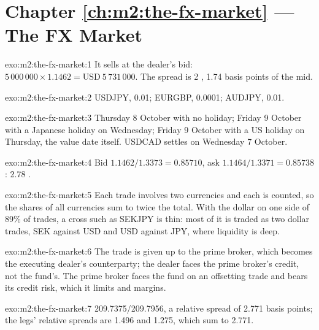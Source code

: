 \section*{Chapter \ref{ch:m2:the-fx-market} --- The FX Market}

\begin{solution}{exo:m2:the-fx-market:1}
It sells at the dealer's bid: $5\,000\,000 \times 1.1462 = \text{USD}~5\,731\,000$.
The spread is 2 , 1.74 basis points of the mid.
\end{solution}

\begin{solution}{exo:m2:the-fx-market:2}
USDJPY,  0.01; EURGBP,  0.0001; AUDJPY,  0.01.
\end{solution}

\begin{solution}{exo:m2:the-fx-market:3}
Thursday 8 October with no holiday; Friday 9 October with a Japanese holiday on
Wednesday; Friday 9 October with a US holiday on Thursday, the value date itself.
USDCAD settles on Wednesday 7 October.
\end{solution}

\begin{solution}{exo:m2:the-fx-market:4}
Bid $1.1462/1.3373 = 0.85710$, ask $1.1464/1.3371 = 0.85738$: 2.78 .
\end{solution}

\begin{solution}{exo:m2:the-fx-market:5}
Each trade involves two currencies and each is counted, so the shares of all
currencies sum to twice the total. With the dollar on one side of 89\% of trades,
a cross such as SEKJPY is thin: most of it is traded as two dollar trades, SEK
against USD and USD against JPY, where liquidity is deep.
\end{solution}

\begin{solution}{exo:m2:the-fx-market:6}
The trade is given up to the prime broker, which becomes the executing dealer's
counterparty; the dealer faces the prime broker's credit, not the fund's. The
prime broker faces the fund on an offsetting trade and bears its credit risk,
which it limits and margins.
\end{solution}

\begin{solution}{exo:m2:the-fx-market:7}
209.7375/209.7956, a relative spread of 2.771 basis points; the legs'
relative spreads are 1.496 and 1.275, which sum to 2.771.
\end{solution}


